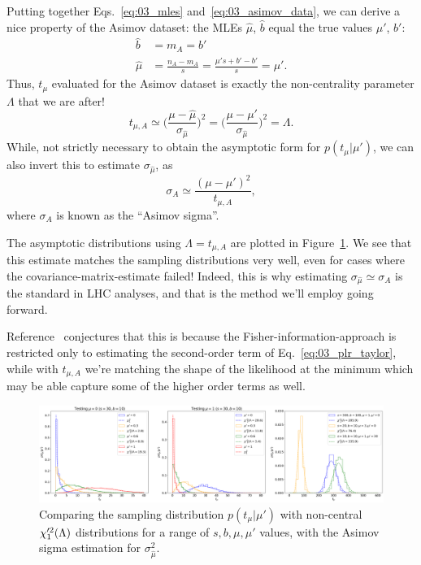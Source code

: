 Putting together Eqs.~\ref{eq:03_mles} and~\ref{eq:03_asimov_data}, we can derive a nice property of the Asimov dataset: the MLEs $\hat\mu$, $\hat b$ equal the true values $\mu'$, $b'$:
\begin{align}
    \hat b &= m_A = b' \\
    \hat \mu &= \frac{n_A - m_A}{s} = \frac{\mu's + b' - b'}{s} = \mu'.
\label{eq:03_asimov_mles}
\end{align}
Thus, $t_\mu$ evaluated for the Asimov dataset is exactly the non-centrality parameter $\Lambda$ that we are after!
\begin{equation}
    t_{\mu, A} \simeq \bigg (\frac{\mu-\hat\mu}{\sigma_{\hat\mu}}\bigg)^2 = \bigg (\frac{\mu-\mu'}{\sigma_{\hat\mu}}\bigg)^2 = \Lambda.
\label{eq:03_tmuasimov}
\end{equation}
While, not strictly necessary to obtain the asymptotic form for $p(t_\mu|\mu')$, we can also invert this to estimate $\sigma_{\hat\mu}$, as
\begin{equation}
    \sigma_A \simeq \frac{(\mu-\mu')^2}{t_{\mu, A}},
\label{eq:03_asimov_sigma}
\end{equation}
where $\sigma_A$ is known as the ``Asimov sigma''.

The asymptotic distributions using $\Lambda = t_{\mu, A}$ are plotted in Figure~\ref{fig:03_ptmu_asym2}.
We see that this estimate matches the sampling distributions very well, even for cases where the covariance-matrix-estimate failed!
Indeed, this is why estimating $\sigma_{\hat\mu} \simeq \sigma_A$ is the standard in LHC analyses, and that is the method we'll employ going forward.

Reference~\cite{Cowan:2010js} conjectures that this is because the Fisher-information-approach is restricted only to estimating the second-order term of Eq.~\ref{eq:03_plr_taylor}, while with $t_{\mu, A}$ we're matching the shape of the likelihood at the minimum which may be able capture some of the higher order terms as well.

\begin{figure}[htb]
  \centering
  \includegraphics[width=\textwidth]{figures/03-Stats/06-asymptotic-plr/3.png}
  \caption{Comparing the sampling distribution $p(t_\mu|\mu')$ with non-central $\chi^{\prime 2}_1(\Lambda)$ distributions for a range of $s, b, \mu, \mu'$ values, with the Asimov sigma estimation for $\sigma^2_{\hat\mu}$.}
  \label{fig:03_ptmu_asym2}
\end{figure}


